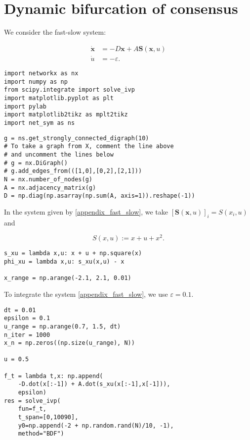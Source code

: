 \hypertarget{dynamic-bifurcation-of-consensus}{%
\section{Dynamic bifurcation of
consensus}\label{dynamic-bifurcation-of-consensus}}

We consider the fast-slow system:

\begin{equation}\label{appendix_fast_slow}
\begin{aligned}
\dot{\mathbf{x}} &= -D\mathbf{x} + A\mathbf{S}(\mathbf{x}, u) \\
\dot{u} &= -\varepsilon .
\end{aligned}
\end{equation}

\begin{verbatim}
import networkx as nx
import numpy as np
from scipy.integrate import solve_ivp
import matplotlib.pyplot as plt
import pylab
import matplotlib2tikz as mplt2tikz
import net_sym as ns
\end{verbatim}

\begin{verbatim}
g = ns.get_strongly_connected_digraph(10)
# To take a graph from X, comment the line above
# and uncomment the lines below
# g = nx.DiGraph()
# g.add_edges_from(([1,0],[0,2],[2,1]))
N = nx.number_of_nodes(g)
A = nx.adjacency_matrix(g)
D = np.diag(np.asarray(np.sum(A, axis=1)).reshape(-1))
\end{verbatim}

In the system given by \cref{appendix_fast_slow}, we take
\([\mathbf{S}(\mathbf{x},u)]_i = S(x_i,u)\) and

\begin{equation}
S(x,u) := x + u + x^2.
\end{equation}

\begin{verbatim}
s_xu = lambda x,u: x + u + np.square(x)
phi_xu = lambda x,u: s_xu(x,u) - x

x_range = np.arange(-2.1, 2.1, 0.01)
\end{verbatim}

To integrate the system \cref{appendix_fast_slow}, we use
\(\varepsilon = 0.1\).

\begin{verbatim}
dt = 0.01
epsilon = 0.1
u_range = np.arange(0.7, 1.5, dt)
n_iter = 1000
x_n = np.zeros((np.size(u_range), N))

u = 0.5

f_t = lambda t,x: np.append(
    -D.dot(x[:-1]) + A.dot(s_xu(x[:-1],x[-1])), 
    epsilon)
res = solve_ivp(
    fun=f_t, 
    t_span=[0,10090], 
    y0=np.append(-2 + np.random.rand(N)/10, -1), 
    method="BDF")
\end{verbatim}


